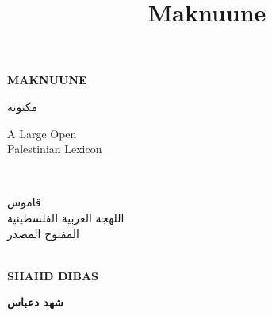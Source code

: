 \documentclass[11pt]{book}
\begin{document}
\setsansfont{Arial}

\frontmatter %


\title{Maknuune}

\begingroup
\thispagestyle{logo}
\centering
\vspace*{3cm}
{\par\fontsize{35}{35}\textbf{MAKNUUNE}\\}
\vspace{20pt}
{\fontsize{45}{45}\foreignlanguage{arabic}{مكنونة} \\}
\vspace*{1cm}
{\par\normalfont\fontsize{30}{30}\selectfont A Large Open \\ Palestinian Lexicon} \\ %
\vspace{1mm}
{\par\normalfont\fontsize{32}{32}\selectfont \foreignlanguage{arabic}{قاموس} \\ \foreignlanguage{arabic}{اللهجة العربية الفلسطينية} \\ \foreignlanguage{arabic}{المفتوح المصدر}} \\ %
\vspace*{2.5cm}
{\normalfont\fontsize{18}{18}\selectfont \textbf{SHAHD DIBAS}}\par %
\vspace{1mm}
{\normalfont\fontsize{20}{20}\selectfont \textbf{\foreignlanguage{arabic}{شهد دعباس}}}\par %
\endgroup

\newpage
\thispagestyle{logo}
\end{document}
